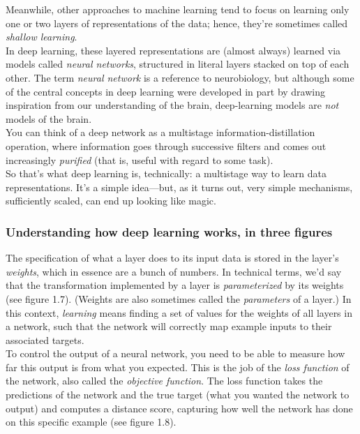 \documentclass{article}
\numberwithin{equation}{section} %
\begin{document}
Meanwhile, other approaches to machine learning tend to focus on learning only one or two layers of representations of the data; hence, they’re sometimes called \textit{shallow learning}. \\

In deep learning, these layered representations are (almost always) learned via
models called \textit{neural networks}, structured in literal layers stacked on top of each other. The term \textit{neural network} is a reference to neurobiology, but although some of the central concepts in deep learning were developed in part by drawing inspiration from our understanding of the brain, deep-learning models are \textit{not} models of the brain. \\

You can think of a deep network as a multistage information-distillation operation, where information goes through successive filters and comes out increasingly \textit{purified} (that is, useful with regard to some task). \\

So that’s what deep learning is, technically: a multistage way to learn data representations. It’s a simple idea—but, as it turns out, very simple mechanisms, sufficiently scaled, can end up looking like magic. \\

\subsubsection{Understanding how deep learning works, in three figures}

The specification of what a layer does to its input data is stored in the layer’s
\textit{weights}, which in essence are a bunch of numbers. In technical terms, we’d say that the transformation implemented by a layer is \textit{parameterized} by its weights (see figure 1.7). (Weights are also sometimes called the \textit{parameters} of a layer.) In this context, \textit{learning} means finding a set of values for the weights of all layers in a network, such that the network will correctly map example inputs to their associated targets. \\

To control the output of a neural network, you need to be able to measure how far this output is from what you expected. This is the job of the \textit{loss function} of the network, also called the \textit{objective function}. The loss function takes the predictions of the network and the true target (what you wanted the network to output) and computes a distance score, capturing how well the network has done on this specific example (see figure 1.8). \\
\end{document}
